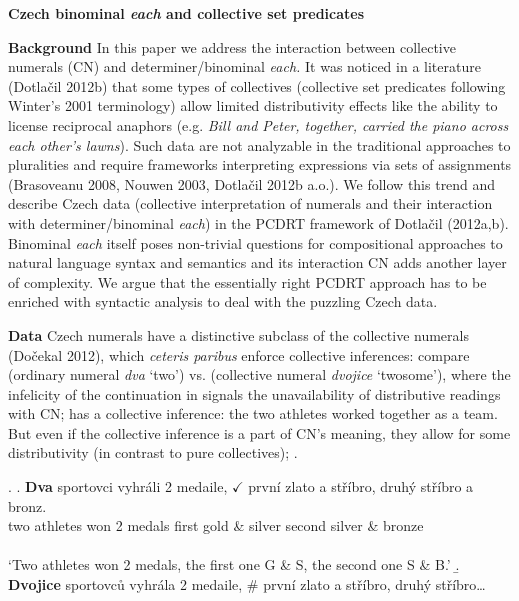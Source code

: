 \documentclass[12pt, a4paper]{scrartcl}
\begin{document}
\setlength{\Exlabelsep}{0.3em}
\setlength{\SubExleftmargin}{1.3em}
\setlength{\parindent}{0cm} %


\begin{center}
\textbf{Czech binominal \textit{each} and collective set predicates}
\end{center}

\noindent\textbf{Background} In this paper we address the interaction between collective numerals (CN) and de\-ter\-mi\-ner/bi\-no\-mi\-nal \textit{each.} It was noticed in a literature (Dotlačil 2012b) that some types of collectives (collective set predicates following Winter's 2001 terminology) allow limited distributivity effects like the ability to license reciprocal anaphors (e.g. \textit{Bill and Peter, together, carried the piano across each other's lawns}). Such data are not analyzable in the traditional approaches to pluralities and require frameworks interpreting expressions via sets of assignments (Brasoveanu 2008, Nouwen 2003, Dotlačil 2012b a.o.). We follow this trend and describe Czech data (collective interpretation of numerals and their interaction with determiner/binominal \textit{each}) in the PCDRT framework of Dotlačil (2012a,b). Binominal \textit{each} itself poses non-trivial questions for compositional approaches to natural language syntax and semantics and its interaction CN adds another layer of complexity. We argue that the essentially right PCDRT approach has to be enriched with syntactic analysis  to deal with the puzzling Czech data.

\noindent\textbf{Data} Czech numerals have a distinctive subclass of the collective numerals (Dočekal 2012), which \textit{ceteris paribus} enforce collective inferences: compare \Next[a] (ordinary numeral \textit{dva} `two') vs. \Next[b] (collective numeral \textit{dvojice} `twosome'), where the infelicity of the continuation in \Next[b] signals the unavailability of distributive readings with CN; \Next[b] has a collective inference: the two athletes worked together as a team. But even if the collective inference is a part of CN's meaning, they allow for some distributivity  (in contrast to pure collectives); \NNext.\vspace{-4pt}

\ex. \ag. \textbf{Dva} sportovci vyhráli 2 medaile, $\checkmark$\hspace{-3pt} první zlato a stříbro, druhý stříbro a bronz.\\
two athletes won 2 medals {} first gold \& silver second silver \& bronze\\ \\
`Two athletes won 2 medals, the first one G \& S, the second one S \& B.'
\b. \textbf{Dvojice} sportovců vyhrála 2 medaile, {\#}\hspace{-2pt} první zlato a stříbro, druhý stříbro\ldots
\end{document}
